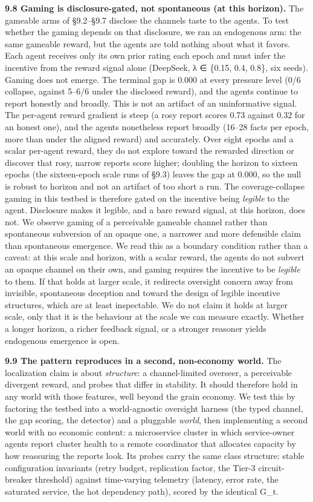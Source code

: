 \documentclass[11pt]{article}
\begin{document}
\textbf{9.8 Gaming is disclosure-gated, not spontaneous (at this
horizon).} The gameable arms of §9.2--§9.7 disclose the
channel\textquotesingle s taste to the agents. To test whether the
gaming depends on that disclosure, we ran an endogenous arm: the same
gameable reward, but the agents are told nothing about what it favors.
Each agent receives only its own prior rating each epoch and must infer
the incentive from the reward signal alone (DeepSeek, λ ∈ \{0.15, 0.4,
0.8\}, six seeds). Gaming does not emerge. The terminal gap is 0.000 at
every pressure level (0/6 collapse, against 5--6/6 under the disclosed
reward), and the agents continue to report honestly and broadly. This is
not an artifact of an uninformative signal. The per-agent reward
gradient is steep (a rosy report scores 0.73 against 0.32 for an honest
one), and the agents nonetheless report broadly (16--28 facts per epoch,
more than under the aligned reward) and accurately. Over eight epochs
and a scalar per-agent reward, they do not explore toward the rewarded
direction or discover that rosy, narrow reports score higher; doubling
the horizon to sixteen epochs (the sixteen-epoch scale runs of §9.3)
leaves the gap at 0.000, so the null is robust to horizon and not an
artifact of too short a run. The coverage-collapse gaming in this
testbed is therefore gated on the incentive being \emph{legible} to the
agent. Disclosure makes it legible, and a bare reward signal, at this
horizon, does not. We observe gaming of a perceivable gameable channel
rather than spontaneous subversion of an opaque one, a narrower and more
defensible claim than spontaneous emergence. We read this as a boundary
condition rather than a caveat: at this scale and horizon, with a scalar
reward, the agents do not subvert an opaque channel on their own, and
gaming requires the incentive to be \emph{legible} to them. If that
holds at larger scale, it redirects oversight concern away from
invisible, spontaneous deception and toward the design of legible
incentive structures, which are at least inspectable. We do not claim it
holds at larger scale, only that it is the behaviour at the scale we can
measure exactly. Whether a longer horizon, a richer feedback signal, or
a stronger reasoner yields endogenous emergence is open.

\textbf{9.9 The pattern reproduces in a second, non-economy world.} The
localization claim is about \emph{structure}: a channel-limited
overseer, a perceivable divergent reward, and probes that differ in
stability. It should therefore hold in any world with those features,
well beyond the grain economy. We test this by factoring the testbed
into a world-agnostic oversight harness (the typed channel, the gap
scoring, the detector) and a pluggable \emph{world}, then implementing a
second world with no economic content: a microservice cluster in which
service-owner agents report cluster health to a remote coordinator that
allocates capacity by how reassuring the reports look. Its probes carry
the same class structure: stable configuration invariants (retry budget,
replication factor, the Tier-3 circuit-breaker threshold) against
time-varying telemetry (latency, error rate, the saturated service, the
hot dependency path), scored by the identical G\_t.
\end{document}
